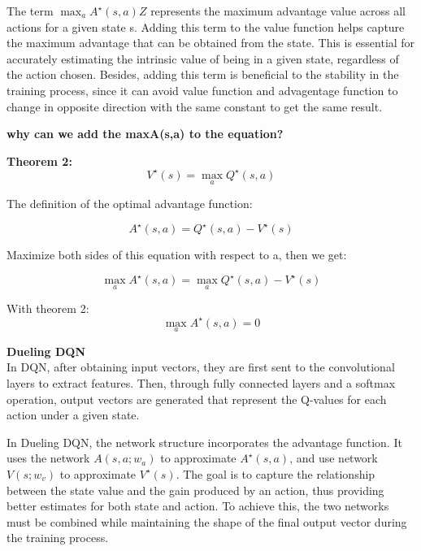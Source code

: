 \documentclass{article}
\begin{document}
The term $\max_a A^{\star}(s,a)Z$ represents the maximum advantage value across all actions for a given state s. Adding this term to the value function helps capture the maximum advantage that can be obtained from the state. This is essential for accurately estimating the intrinsic value of being in a given state, regardless of the action chosen. Besides, adding this term is beneficial to the stability in the training process, since it can avoid value function and advagentage function to change in opposite direction with the same constant to get the same result. \\ 

\begin{mdframed}[hidealllines=false,backgroundcolor=white!20]
\textbf{why can we add the maxA(s,a) to the equation?}

\textbf{Theorem 2:}
\begin{equation}
V^{\star}(s) = \max_a Q^{\star}(s,a)
\end{equation}

The definition of the optimal advantage function:

\begin{equation}
A^{\star}(s,a) = Q^{\star}(s,a) - V^{\star}(s)
\end{equation}

Maximize both sides of this equation with respect to a, then we get:

\begin{equation}
\max_a A^{\star}(s,a) = \max_a Q^{\star}(s,a) - V^{\star}(s)
\end{equation}

With theorem 2:
\begin{equation}
\max_a A^{\star}(s,a) = 0
\end{equation}
\end{mdframed}

\hspace*{\fill}

\noindent
\textbf{Dueling DQN}\\
\noindent
In DQN, after obtaining input vectors, they are first sent to the convolutional layers to extract features. Then, through fully connected layers and a softmax operation, output vectors are generated that represent the Q-values for each action under a given state.

In Dueling DQN, the network structure incorporates the advantage function. It uses the network $A(s,a;w_a)$ to approximate $A^{\star}(s,a)$, and use network $V(s;w_v)$ to approximate $V^{\star}(s)$. The goal is to capture the relationship between the state value and the gain produced by an action, thus providing better estimates for both state and action. To achieve this, the two networks must be combined while maintaining the shape of the final output vector during the training process.
\end{document}
